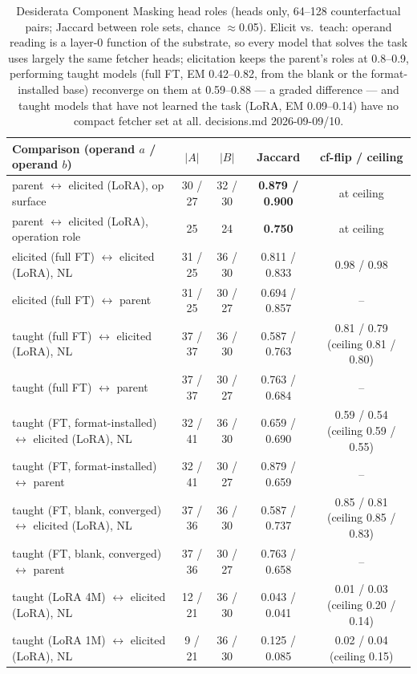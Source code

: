 \begin{table}[t]
\centering
\begin{tabular}{lcccc}
\hline
Comparison (operand $a$ / operand $b$) & $|A|$ & $|B|$ & Jaccard & cf-flip / ceiling \\
\hline
parent $\leftrightarrow$ elicited (LoRA), op surface & 30 / 27 & 32 / 30 & \textbf{0.879 / 0.900} & at ceiling \\
parent $\leftrightarrow$ elicited (LoRA), operation role & 25 & 24 & \textbf{0.750} & at ceiling \\
elicited (full FT) $\leftrightarrow$ elicited (LoRA), NL & 31 / 25 & 36 / 30 & 0.811 / 0.833 & 0.98 / 0.98 \\
elicited (full FT) $\leftrightarrow$ parent & 31 / 25 & 30 / 27 & 0.694 / 0.857 & -- \\
taught (full FT) $\leftrightarrow$ elicited (LoRA), NL & 37 / 37 & 36 / 30 & 0.587 / 0.763 & 0.81 / 0.79 (ceiling 0.81 / 0.80) \\
taught (full FT) $\leftrightarrow$ parent & 37 / 37 & 30 / 27 & 0.763 / 0.684 & -- \\
taught (FT, format-installed) $\leftrightarrow$ elicited (LoRA), NL & 32 / 41 & 36 / 30 & 0.659 / 0.690 & 0.59 / 0.54 (ceiling 0.59 / 0.55) \\
taught (FT, format-installed) $\leftrightarrow$ parent & 32 / 41 & 30 / 27 & 0.879 / 0.659 & -- \\
taught (FT, blank, converged) $\leftrightarrow$ elicited (LoRA), NL & 37 / 36 & 36 / 30 & 0.587 / 0.737 & 0.85 / 0.81 (ceiling 0.85 / 0.83) \\
taught (FT, blank, converged) $\leftrightarrow$ parent & 37 / 36 & 30 / 27 & 0.763 / 0.658 & -- \\
taught (LoRA 4M) $\leftrightarrow$ elicited (LoRA), NL & 12 / 21 & 36 / 30 & 0.043 / 0.041 & 0.01 / 0.03 (ceiling 0.20 / 0.14) \\
taught (LoRA 1M) $\leftrightarrow$ elicited (LoRA), NL & 9 / 21 & 36 / 30 & 0.125 / 0.085 & 0.02 / 0.04 (ceiling 0.15) \\
\hline
\end{tabular}
\caption{Desiderata Component Masking head roles (heads only, 64--128 counterfactual pairs; Jaccard between role sets, chance $\approx$0.05). Elicit vs.\ teach: operand reading is a layer-0 function of the substrate, so every model that solves the task uses largely the same fetcher heads; elicitation keeps the parent's roles at 0.8--0.9, performing taught models (full FT, EM 0.42--0.82, from the blank or the format-installed base) reconverge on them at 0.59--0.88 --- a graded difference --- and taught models that have not learned the task (LoRA, EM 0.09--0.14) have no compact fetcher set at all. decisions.md 2026-09-09/10.}
\label{tab:dcm_roles}
\end{table}

